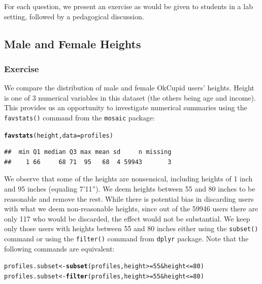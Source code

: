 \documentclass{article}\usepackage[]{graphicx}\usepackage[]{color}
\makeatletter
\newcommand{\hlnum}[1]{\textcolor[rgb]{0.686,0.059,0.569}{#1}}%
\newcommand{\hlopt}[1]{\textcolor[rgb]{0,0,0}{#1}}%
\newcommand{\hlstd}[1]{\textcolor[rgb]{0.345,0.345,0.345}{#1}}%
\newcommand{\hlkwb}[1]{\textcolor[rgb]{0.69,0.353,0.396}{#1}}%
\newcommand{\hlkwc}[1]{\textcolor[rgb]{0.333,0.667,0.333}{#1}}%
\newcommand{\hlkwd}[1]{\textcolor[rgb]{0.737,0.353,0.396}{\textbf{#1}}}%
\newenvironment{kframe}{%
 \def\at@end@of@kframe{}%
 \ifinner\ifhmode%
  \def\at@end@of@kframe{\end{minipage}}%
  \begin{minipage}{\columnwidth}%
 \fi\fi%
 \def\FrameCommand##1{\hskip\@totalleftmargin \hskip-\fboxsep
 \colorbox{shadecolor}{##1}\hskip-\fboxsep
     \hskip-\linewidth \hskip-\@totalleftmargin \hskip\columnwidth}%
 \MakeFramed {\advance\hsize-\width
   \@totalleftmargin\z@ \linewidth\hsize
   \@setminipage}}%
 {\par\unskip\endMakeFramed%
 \at@end@of@kframe}
\newenvironment{knitrout}{}{} %
\makeatother
\begin{document}
For each question, we present an exercise as would be given to students in a lab setting, followed by a pedagogical discussion.


\subsection{Male and Female Heights}\label{section_height}
\subsubsection{Exercise}
We compare the distribution of male and female OkCupid users' heights.  Height is one of 3 numerical variables in this dataset (the others being age and income).  This provides us an opportunity to investigate numerical summaries using the \verb#favstats()# command from the \verb#mosaic# package:

\begin{center}
\begin{knitrout}
\color{fgcolor}\begin{kframe}
\begin{alltt}
\hlkwd{favstats}\hlstd{(height,} \hlkwc{data}\hlstd{=profiles)}
\end{alltt}
\begin{verbatim}
##  min Q1 median Q3 max mean sd     n missing
##    1 66     68 71  95   68  4 59943       3
\end{verbatim}
\end{kframe}
\end{knitrout}
\end{center}

We observe that some of the heights are nonsensical, including heights of 1 inch and 95 inches (equaling 7'11'').  We deem heights between 55 and 80 inches to be reasonable and remove the rest.  While there is potential bias in discarding users with what we deem non-reasonable heights, since out of the 59946 users there are only 117 who would be discarded, the effect would not be substantial.  We keep only those users with heights between 55 and 80 inches either using the \verb#subset()# command or using the \verb#filter()# command from \verb#dplyr# package. Note that the following commands are equivalent:

\begin{knitrout}
\color{fgcolor}\begin{kframe}
\begin{alltt}
\hlstd{profiles.subset} \hlkwb{<-} \hlkwd{subset}\hlstd{(profiles, height}\hlopt{>=}\hlnum{55} \hlopt{&} \hlstd{height} \hlopt{<=}\hlnum{80}\hlstd{)}
\hlstd{profiles.subset} \hlkwb{<-} \hlkwd{filter}\hlstd{(profiles, height}\hlopt{>=}\hlnum{55} \hlopt{&} \hlstd{height} \hlopt{<=}\hlnum{80}\hlstd{)}
\end{alltt}
\end{kframe}
\end{knitrout}
\end{document}
